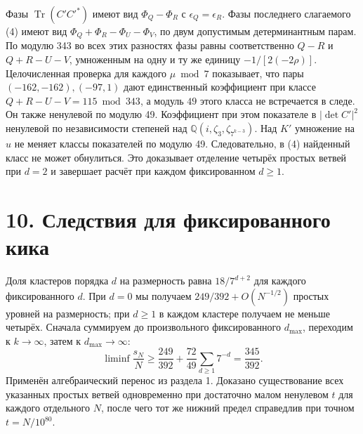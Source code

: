 \documentclass[11pt,a4paper]{article}
\newcommand{\Tr}{\operatorname{Tr}}
\newcommand{\sect}[1]{\section*{\sffamily\color{ink}#1}}
\newcommand{\QQ}{\mathbb Q}
\begin{document}
Фазы \(\Tr(C'C'^*)\) имеют вид \(\Phi_Q-\Phi_R\) с \(\epsilon_Q=\epsilon_R\). Фазы последнего слагаемого (4) имеют вид \(\Phi_Q+\Phi_R-\Phi_U-\Phi_V\), по двум допустимым детерминантным парам. По модулю 343 во всех этих разностях фазы равны соответственно \(Q-R\) и \(Q+R-U-V\), умноженным на одну и ту же единицу \(-1/[2(-2\rho)]\). Целочисленная проверка для каждого \(\mu\bmod7\) показывает, что пары \((-162,-162),(-97,1)\) дают единственный коэффициент при классе \(Q+R-U-V=115\bmod343\), а модуль \(49\) этого класса не встречается в следе. Он также ненулевой по модулю 49. Коэффициент при этом показателе в \(|\det C'|^2\) ненулевой по независимости степеней над \(\QQ(i,\zeta_3,\zeta_{7^{k-3}})\). Над \(K'\) умножение на \(u\) не меняет классы показателей по модулю 49. Следовательно, в (4) найденный класс не может обнулиться. Это доказывает отделение четырёх простых ветвей при \(d=2\) и завершает расчёт при каждом фиксированном \(d\ge1\).
\newpage
\sect{10. Следствия для фиксированного кика}
Доля кластеров порядка \(d\) на размерность равна \(18/7^{d+2}\) для каждого фиксированного \(d\). При \(d=0\) мы получаем \(249/392+O(N^{-1/2})\) простых уровней на размерность; при \(d\ge1\) в каждом кластере получаем не меньше четырёх. Сначала суммируем до произвольного фиксированного \(d_{\max}\), переходим к \(k\to\infty\), затем к \(d_{\max}\to\infty\):
\[
 \liminf \frac{s_N}{N}\ge\frac{249}{392}+\frac{72}{49}\sum_{d\ge1}7^{-d}
                         =\frac{345}{392}.
\]
Применён алгебраический перенос из раздела 1. Доказано существование всех указанных простых ветвей одновременно при достаточно малом ненулевом \(t\) для каждого отдельного \(N\), после чего тот же нижний предел справедлив при точном \(t=N/10^{80}\).
\end{document}
